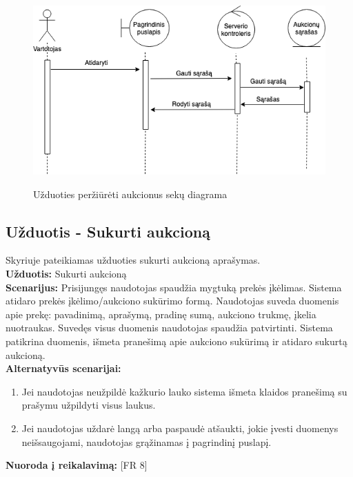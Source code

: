 \documentclass{VUMIFPSkursinis}
\begin{document}
			\begin{figure}[H]
		\centering
		\includegraphics[width=\linewidth]{img/auctionsSequence.png}
		\label{fig:aukcionai}
		\caption{Užduoties peržiūrėti aukcionus sekų diagrama}
	\end{figure}

	\subsection{Užduotis - Sukurti aukcioną}
	Skyriuje pateikiamas užduoties sukurti aukcioną aprašymas.\\
	\textbf{Užduotis:}  Sukurti aukcioną \\
	\textbf{Scenarijus:}  Prisijungęs naudotojas spaudžia mygtuką prekės įkėlimas. Sistema atidaro prekės įkėlimo/aukciono sukūrimo formą. Naudotojas suveda duomenis apie prekę: pavadinimą, aprašymą, pradinę sumą, aukciono trukmę, įkelia nuotraukas. Suvedęs visus duomenis naudotojas spaudžia patvirtinti. Sistema patikrina duomenis, išmeta pranešimą apie aukciono sukūrimą ir atidaro sukurtą aukcioną.\\
	\textbf{Alternatyvūs scenarijai:}
	\begin{enumerate}
		\item Jei naudotojas neužpildė kažkurio lauko sistema išmeta klaidos pranešimą su prašymu užpildyti visus laukus.
		\item Jei naudotojas uždarė langą arba paspaudė atšaukti, jokie įvesti duomenys neišsaugojami, naudotojas grąžinamas į pagrindinį puslapį.
	\end{enumerate}
	\textbf{Nuoroda į reikalavimą: } [FR 8]
	
\end{document}
